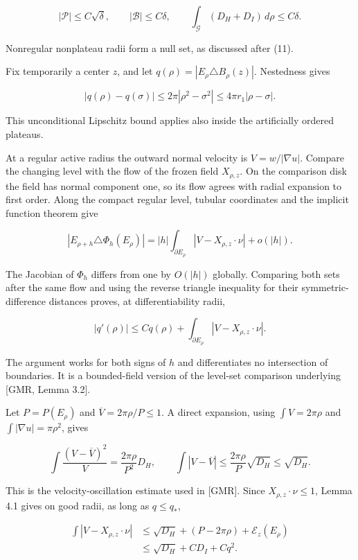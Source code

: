 \documentclass[11pt]{article}
\begin{document}
\[
|\mathcal P|\le C\sqrt\delta,\qquad
|\mathcal B|\le C\delta,\qquad
\int_{\mathcal G}(D_H+D_I)\,d\rho\le C\delta.
\tag{26}
\]

Nonregular nonplateau radii form a null set, as discussed after (11).

Fix temporarily a center \(z\), and let
\(q(\rho)=|E_\rho\triangle B_\rho(z)|\). Nestedness gives

\[
|q(\rho)-q(\sigma)|\le2\pi|\rho^2-\sigma^2|
\le4\pi r_1|\rho-\sigma|.
\tag{27}
\]

This unconditional Lipschitz bound applies also inside the artificially
ordered plateaus.

At a regular active radius the outward normal velocity is
\(V=w/|\nabla u|\). Compare the changing level with the flow of the
frozen field \(X_{\rho,z}\). On the comparison disk the field has normal
component one, so its flow agrees with radial expansion to first order.
Along the compact regular level, tubular coordinates and the implicit
function theorem give

\[
|E_{\rho+h}\triangle\Phi_h(E_\rho)|
=|h|\int_{\partial E_\rho}|V-X_{\rho,z}\cdot\nu|+o(|h|).
\]

The Jacobian of \(\Phi_h\) differs from one by \(O(|h|)\) globally.
Comparing both sets after the same flow and using the reverse triangle
inequality for their symmetric-difference distances proves, at
differentiability radii,

\[
|q'(\rho)|\le Cq(\rho)+
\int_{\partial E_\rho}|V-X_{\rho,z}\cdot\nu|.
\tag{28}
\]

The argument works for both signs of \(h\) and differentiates no
intersection of boundaries. It is a bounded-field version of the
level-set comparison underlying {[}GMR, Lemma 3.2{]}.

Let \(P=P(E_\rho)\) and \(\overline V=2\pi\rho/P\le1\). A direct
expansion, using \(\int V=2\pi\rho\) and \(\int|\nabla u|=\pi\rho^2\),
gives

\[
\int\frac{(V-\overline V)^2}{V}
=\frac{2\pi\rho}{P^2}D_H,
\qquad
\int|V-\overline V|\le\frac{2\pi\rho}{P}\sqrt{D_H}\le\sqrt{D_H}.
\tag{29}
\]

This is the velocity-oscillation estimate used in {[}GMR{]}. Since
\(X_{\rho,z}\cdot\nu\le1\), Lemma 4.1 gives on good radii, as long as
\(q\le q_*\),

\[
\begin{aligned}
\int|V-X_{\rho,z}\cdot\nu|
&\le\sqrt{D_H}+(P-2\pi\rho)+\mathcal E_z(E_\rho)\\
&\le\sqrt{D_H}+CD_I+Cq^2.
\end{aligned}
\]
\end{document}
